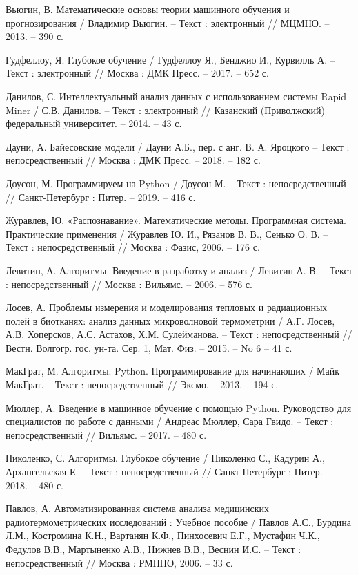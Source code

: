 \begin{thebibliography}{3}
	 Вьюгин, В. Математические основы теории машинного обучения и прогнозирования / Владимир Вьюгин. -- Текст : электронный // МЦМНО. -- 2013. -- 390 с.
	
	 Гудфеллоу, Я.  Глубокое обучение / Гудфеллоу Я., Бенджио И., Курвилль А. -- Текст : электронный // Москва : ДМК Пресс. -- 2017. -- 652 с.	
	
	 Данилов, С.  Интеллектуальный анализ данных с использованием системы Rapid
	Miner / С.В. Данилов. -- Текст : электронный // Казанский (Приволжский) федеральный университет. -- 2014. -- 43 с.			
	
	 Дауни, А. Байесовские модели / Дауни А.Б., пер. с анг. В. А. Яроцкого -- Текст : непосредственный // Москва : ДМК Пресс. -- 2018. -- 182 с.				
	
	 Доусон, М. Программируем на Python / Доусон М. -- Текст : непосредственный // Санкт-Петербург : Питер. -- 2019. -- 416 с.	
	
	 Журавлев, Ю. «Распознавание». Математические методы. Программная система. Практические применения / Журавлев Ю. И., Рязанов В. В., Сенько О. В. -- Текст : непосредственный // Москва : Фазис, 2006. -- 176 с.
	
	 Левитин, А. Алгоритмы. Введение в разработку и анализ / Левитин А. В. -- Текст : непосредственный // Москва : Вильямс. -- 2006. -- 576 с.		
	
	 Лосев, А. Проблемы измерения и моделирования тепловых и радиационных полей в биотканях: анализ данных микроволновой термометрии / А.Г. Лосев, А.В. Хоперсков, А.С. Астахов, Х.М. Сулейманова. -- Текст : непосредственный // Вестн. Волгогр. гос. ун-та. Сер. 1, Мат. Физ. -- 2015. -- No 6 -- 41 с.						
	
	 МакГрат, М. Алгоритмы. Python. Программирование для начинающих / Майк МакГрат. -- Текст : непосредственный // Эксмо. -- 2013. -- 194 с.							
	
	 Мюллер, А. Введение в машинное обучение с помощью Python. Руководство для специалистов по работе с данными / Андреас Мюллер, Сара Гвидо. -- Текст : непосредственный // Вильямс. -- 2017. -- 480 с.				
	
	 Николенко, С. Алгоритмы. Глубокое обучение / Николенко С., Кадурин А., Архангельская Е. -- Текст : непосредственный // Санкт-Петербург : Питер. -- 2018. -- 480 с.
	
	 Павлов, А. Автоматизированная система анализа медицинских радиотермометрических исследований : Учебное пособие / Павлов А.С., Бурдина Л.М., Костромина К.Н., Вартанян К.Ф., Пинхосевич Е.Г., Мустафин Ч.К., Федулов В.В., Мартыненко А.В., Нижнев В.В., Веснин И.С. -- Текст : непосредственный // Москва : РМНПО, 2006. -- 33 с.
	

\end{thebibliography}
